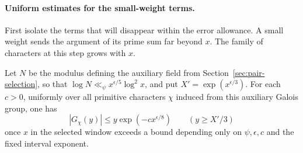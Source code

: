 \paragraph{Uniform estimates for the small-weight terms.}
\label{par:thin-host}
First isolate the terms that will disappear within the error allowance. A small weight
sends the argument of its prime sum far beyond \(x\). The family of characters at this step grows with \(x\).

\begin{lemma}
Let \(N\) be the modulus defining the auxiliary field from
Section~\ref{sec:pair-selection}, so that
\(\log N\ll_\psi x^{\epsilon/5}\log^2 x\), and put
\(X'=\exp(x^{\epsilon/3})\). For each \(c>0\), uniformly over
all primitive characters \(\chi\) induced from this auxiliary
Galois group, one has
\begin{equation}\label{eq:thin-host}
    |G_\chi(y)|\le y\exp(-c x^{\epsilon/8})
                  \qquad (y\ge X'/3)
\end{equation}
once \(x\) in the selected window exceeds a bound depending only on
\(\psi,\epsilon,c\) and the fixed interval exponent.
\end{lemma}

